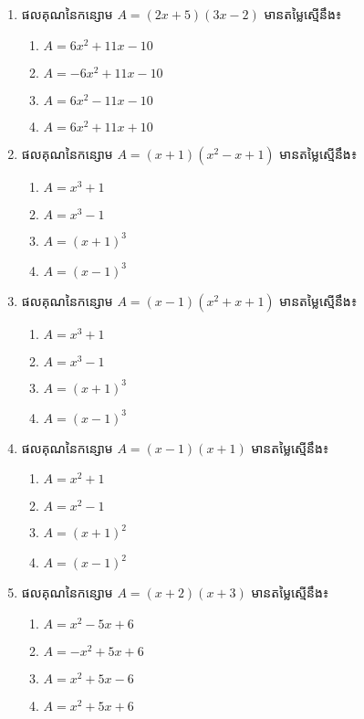 \newpage
\pros
\begin{enumerate}
\item ផលគុណនៃកន្សោម $A=(2x+5)(3x-2)$ មានតម្លៃស្មើនឹង៖
\begin{multicols}{2}
\begin{enumerate}[label=\alph*.]
\item $A=6x^2+11x-10$
\item $A=-6x^2+11x-10$
\item $A=6x^2-11x-10$
\item $A=6x^2+11x+10$
\end{enumerate}
\end{multicols}
\item ផលគុណនៃកន្សោម $A=(x+1)(x^2-x+1)$ មានតម្លៃស្មើនឹង៖
\begin{multicols}{4}
\begin{enumerate}[label=\alph*.]
\item $A=x^3+1$
\item $A=x^3-1$
\item $A=(x+1)^3$
\item $A=(x-1)^3$
\end{enumerate}
\end{multicols}
\item ផលគុណនៃកន្សោម $A=(x-1)(x^2+x+1)$ មានតម្លៃស្មើនឹង៖
\begin{multicols}{4}
\begin{enumerate}[label=\alph*.]
\item $A=x^3+1$
\item $A=x^3-1$
\item $A=(x+1)^3$
\item $A=(x-1)^3$
\end{enumerate}
\end{multicols}
\item ផលគុណនៃកន្សោម $A=(x-1)(x+1)$ មានតម្លៃស្មើនឹង៖
\begin{multicols}{4}
\begin{enumerate}[label=\alph*.]
\item $A=x^2+1$
\item $A=x^2-1$
\item $A=(x+1)^2$
\item $A=(x-1)^2$
\end{enumerate}
\end{multicols}

\item ផលគុណនៃកន្សោម $A=(x+2)(x+3)$ មានតម្លៃស្មើនឹង៖
\begin{multicols}{2}
\begin{enumerate}[label=\alph*.]
\item $A=x^2-5x+6$
\item $A=-x^2+5x+6$
\item $A=x^2+5x-6$
\item $A=x^2+5x+6$
\end{enumerate}
\end{multicols}


\end{enumerate}
